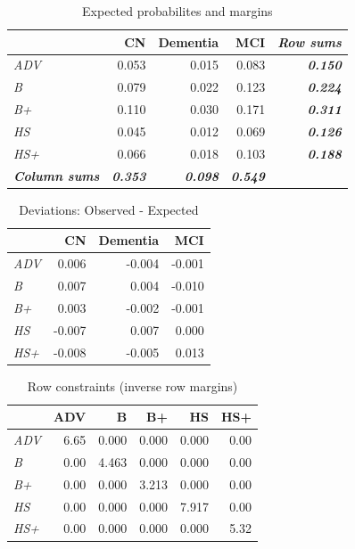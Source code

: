 \documentclass[
  ignorenonframetext,
]{beamer}
\begin{document}
\begin{frame}

\begin{table}[t]

\caption{\label{tab:edu_dx_chi2_e}Expected probabilites and margins}
\centering
\begin{tabular}{>{\em}lrrr>{\bfseries\em}r}
\toprule
  & CN & Dementia & MCI & Row sums\\
\midrule
ADV & 0.053 & 0.015 & 0.083 & 0.150\\
B & 0.079 & 0.022 & 0.123 & 0.224\\
B+ & 0.110 & 0.030 & 0.171 & 0.311\\
HS & 0.045 & 0.012 & 0.069 & 0.126\\
HS+ & 0.066 & 0.018 & 0.103 & 0.188\\
\addlinespace
\em{\textbf{Column sums}} & \em{\textbf{0.353}} & \em{\textbf{0.098}} & \em{\textbf{0.549}}\\
\bottomrule
\end{tabular}
\end{table}

\end{frame}

\begin{frame}

\begin{table}[t]

\caption{\label{tab:edu_dx_chi2_z}Deviations: Observed - Expected}
\centering
\begin{tabular}{>{\em}lrrr}
\toprule
  & CN & Dementia & MCI\\
\midrule
ADV & 0.006 & -0.004 & -0.001\\
B & 0.007 & 0.004 & -0.010\\
B+ & 0.003 & -0.002 & -0.001\\
HS & -0.007 & 0.007 & 0.000\\
HS+ & -0.008 & -0.005 & 0.013\\
\bottomrule
\end{tabular}
\end{table}

\end{frame}

\begin{frame}

\begin{table}[t]

\caption{\label{tab:edu_dx_chi2_rowconstraints}Row constraints (inverse row margins)}
\centering
\begin{tabular}{>{\em}lrrrrr}
\toprule
  & ADV & B & B+ & HS & HS+\\
\midrule
ADV & 6.65 & 0.000 & 0.000 & 0.000 & 0.00\\
B & 0.00 & 4.463 & 0.000 & 0.000 & 0.00\\
B+ & 0.00 & 0.000 & 3.213 & 0.000 & 0.00\\
HS & 0.00 & 0.000 & 0.000 & 7.917 & 0.00\\
HS+ & 0.00 & 0.000 & 0.000 & 0.000 & 5.32\\
\bottomrule
\end{tabular}
\end{table}

\end{frame}
\end{document}
